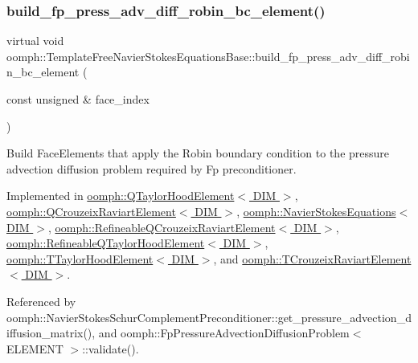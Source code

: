 \subsubsection{\texorpdfstring{build\+\_\+fp\+\_\+press\+\_\+adv\+\_\+diff\+\_\+robin\+\_\+bc\+\_\+element()}{build\_fp\_press\_adv\_diff\_robin\_bc\_element()}}
{\footnotesize\ttfamily virtual void oomph\+::\+Template\+Free\+Navier\+Stokes\+Equations\+Base\+::build\+\_\+fp\+\_\+press\+\_\+adv\+\_\+diff\+\_\+robin\+\_\+bc\+\_\+element (\begin{DoxyParamCaption}\item[{const unsigned \&}]{face\+\_\+index }\end{DoxyParamCaption})\hspace{0.3cm}{\ttfamily [pure virtual]}}



Build Face\+Elements that apply the Robin boundary condition to the pressure advection diffusion problem required by Fp preconditioner. 



Implemented in \hyperlink{classoomph_1_1QTaylorHoodElement_aa3c4eabbedadb47c3bcbbbe22febf3cf}{oomph\+::\+Q\+Taylor\+Hood\+Element$<$ D\+I\+M $>$}, \hyperlink{classoomph_1_1QCrouzeixRaviartElement_a5b824083683ead3f8bead4061bce21f1}{oomph\+::\+Q\+Crouzeix\+Raviart\+Element$<$ D\+I\+M $>$}, \hyperlink{classoomph_1_1NavierStokesEquations_a16bfab3df70ad2204217590c0e3b7de1}{oomph\+::\+Navier\+Stokes\+Equations$<$ D\+I\+M $>$}, \hyperlink{classoomph_1_1RefineableQCrouzeixRaviartElement_a734c84a54196ba141791e7471d7c3c7d}{oomph\+::\+Refineable\+Q\+Crouzeix\+Raviart\+Element$<$ D\+I\+M $>$}, \hyperlink{classoomph_1_1RefineableQTaylorHoodElement_ab7f69a90be6e5129d2dbf294e01642af}{oomph\+::\+Refineable\+Q\+Taylor\+Hood\+Element$<$ D\+I\+M $>$}, \hyperlink{classoomph_1_1TTaylorHoodElement_a3ed1ee43804db6acde4aa996a0e878c0}{oomph\+::\+T\+Taylor\+Hood\+Element$<$ D\+I\+M $>$}, and \hyperlink{classoomph_1_1TCrouzeixRaviartElement_ad99c365335e965607273f133d8739ae2}{oomph\+::\+T\+Crouzeix\+Raviart\+Element$<$ D\+I\+M $>$}.



Referenced by oomph\+::\+Navier\+Stokes\+Schur\+Complement\+Preconditioner\+::get\+\_\+pressure\+\_\+advection\+\_\+diffusion\+\_\+matrix(), and oomph\+::\+Fp\+Pressure\+Advection\+Diffusion\+Problem$<$ E\+L\+E\+M\+E\+N\+T $>$\+::validate().

\mbox{\label{classoomph_1_1TemplateFreeNavierStokesEquationsBase_ac0505918d7458688c9cf55d348c92120}} 
